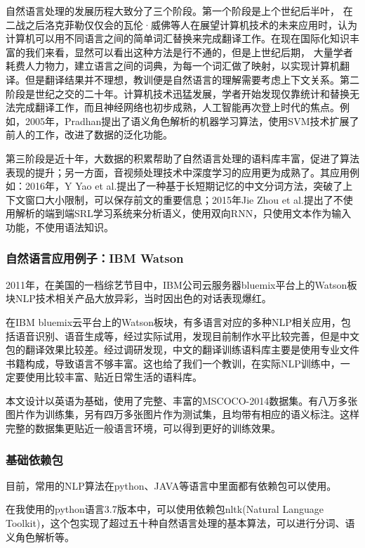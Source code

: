 自然语言处理的发展历程大致分了三个阶段。第一个阶段是上个世纪后半叶，
在二战之后洛克菲勒仅仅会的瓦伦·威佛等人在展望计算机技术的未来应用时，认为计算机可以用不同语言之间的简单词汇替换来完成翻译工作。在现在国际化知识丰富的我们来看，显然可以看出这种方法是行不通的，但是上世纪后期，
大量学者耗费人力物力，建立语言之间的词典，为每一个词汇做了映射，以实现计算机翻译。但是翻译结果并不理想，教训便是自然语言的理解需要考虑上下文关系。第二阶段是世纪之交的二十年。计算机技术迅猛发展，学者开始发现仅靠统计和替换无法完成翻译工作，而且神经网络也初步成熟，人工智能再次登上时代的焦点。例如，2005年，Pradhan提出了语义角色解析的机器学习算法，使用SVM技术扩展了前人的工作，改进了数据的泛化功能。

第三阶段是近十年，大数据的积累帮助了自然语言处理的语料库丰富，促进了算法表现的提升；另一方面，音视频处理技术中深度学习的应用更为成熟了。其应用例如：2016年，Y Yao et al.提出了一种基于长短期记忆的中文分词方法，突破了上下文窗口大小限制，可以保存前文的重要信息；2015年Jie Zhou et al.提出了不使用解析的端到端SRL学习系统来分析语义，使用双向RNN，只使用文本作为输入功能，不使用语法知识。

\subsubsection{自然语言应用例子：IBM Watson}
2011年，在美国的一档综艺节目中，IBM公司云服务器bluemix平台上的Watson板块NLP技术相关产品大放异彩，当时因出色的对话表现爆红。

在IBM bluemix云平台上的Watson板块，有多语言对应的多种NLP相关应用，包括语音识别、语音生成等，经过实际试用，发现目前制作水平比较完善，但是中文包的翻译效果比较差。经过调研发现，中文的翻译训练语料库主要是使用专业文件书籍构成，导致语言不够丰富。这也给了我们一个教训，在实际NLP训练中，一定要使用比较丰富、贴近日常生活的语料库。

本文设计以英语为基础，使用了完整、丰富的MSCOCO-2014数据集。有八万多张图片作为训练集，另有四万多张图片作为测试集，且均带有相应的语义标注。这样完整的数据集更贴近一般语言环境，可以得到更好的训练效果。

\subsubsection{基础依赖包}
目前，常用的NLP算法在python、JAVA等语言中里面都有依赖包可以使用。

在我使用的python语言3.7版本中，可以使用依赖包nltk(Natural Language Toolkit)，这个包实现了超过五十种自然语言处理的基本算法，可以进行分词、语义角色解析等。

